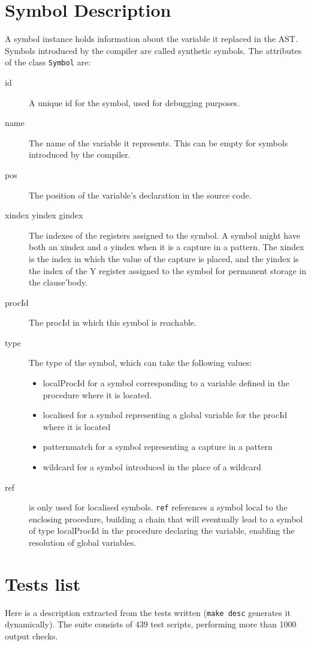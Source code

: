 \documentclass[a4paper]{memoir}
\begin{document}
\begin{appendices}
\chapter{Symbol Description}\label{appendix:symbol}
A symbol instance holds information about the variable it replaced in the AST. Symbols introduced by the compiler are called synthetic symbols.
The attributes of the class \lstinline!Symbol! are:
\begin{description}
  \item[id] A unique id for the symbol, used for debugging purposes.
  \item[name] The name of the variable it represents. This can be empty for symbols introduced by the compiler.
  \item[pos] The position of the variable's declaration in the source code.
  \item[xindex yindex gindex] The indexes of the registers assigned to the symbol. A symbol might have both an xindex and a yindex when it is a capture in a pattern. The xindex is the index in which the value of the capture is placed, and the yindex is the index of the Y register assigned to the symbol for permanent storage in the clause'body.
  \item[procId] The procId in which this symbol is reachable.
  \item[type] The type of the symbol, which can take the following values:
    \begin{itemize}
      \item localProcId for a symbol corresponding to a variable defined in the procedure where it is located.
      \item localised for a symbol representing a global variable for the procId where it is located
      \item patternmatch for a symbol representing a capture in a pattern
      \item wildcard for a symbol introduced in the place of a wildcard
    \end{itemize}
  \item[ref] is only used for localised symbols. \lstinline!ref! references a symbol local to the enclosing procedure, building a chain that will eventually lead to a symbol of type localProcId in the procedure declaring the variable, enabling the resolution of global variables.
\end{description}

\chapter{Tests list}
Here is a description extracted from the tests written (\lstinline!make desc!
generates it dynamically).
The suite consists of 439 test scripts, performing more than 1000 output
checks.


\end{appendices}
\end{document}
